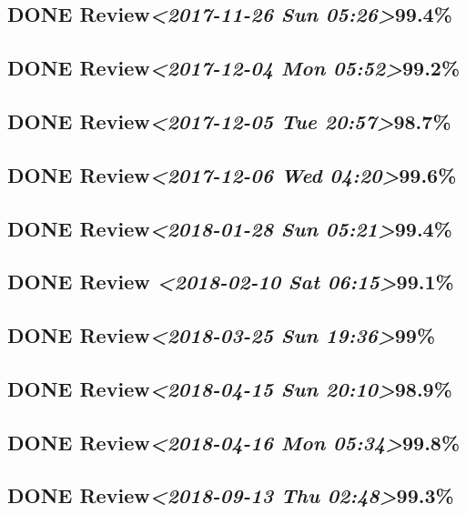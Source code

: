 \documentclass[11pt]{ctexart}
\begin{document}
\subsection{{\bfseries\sffamily DONE} Review\textit{<2017-11-26 Sun 05:26>}99.4\%}
\label{sec:org7946c4d}
\subsection{{\bfseries\sffamily DONE} Review\textit{<2017-12-04 Mon 05:52>}99.2\%}
\label{sec:orga8f8c01}
\subsection{{\bfseries\sffamily DONE} Review\textit{<2017-12-05 Tue 20:57>}98.7\%}
\label{sec:org79bdcff}
\subsection{{\bfseries\sffamily DONE} Review\textit{<2017-12-06 Wed 04:20>}99.6\%}
\label{sec:orgcbe3eab}
\subsection{{\bfseries\sffamily DONE} Review\textit{<2018-01-28 Sun 05:21>}99.4\%}
\label{sec:org352dbb1}
\subsection{{\bfseries\sffamily DONE} Review \textit{<2018-02-10 Sat 06:15>}99.1\%}
\label{sec:org643da6d}
\subsection{{\bfseries\sffamily DONE} Review\textit{<2018-03-25 Sun 19:36>}99\%}
\label{sec:orga98bb4c}
\subsection{{\bfseries\sffamily DONE} Review\textit{<2018-04-15 Sun 20:10>}98.9\%}
\label{sec:org9a28934}
\subsection{{\bfseries\sffamily DONE} Review\textit{<2018-04-16 Mon 05:34>}99.8\%}
\label{sec:org977846d}
\subsection{{\bfseries\sffamily DONE} Review\textit{<2018-09-13 Thu 02:48>}99.3\%}
\label{sec:orgea16ef0}
\end{document}
